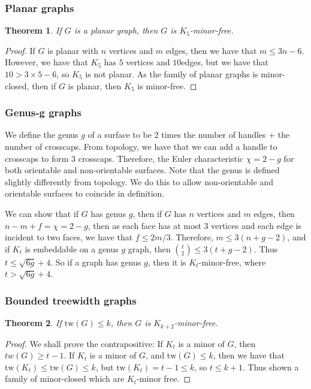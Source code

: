 \documentclass[]{article}
\newcommand{\tw}{\text{tw}}
\newtheorem{theorem}{Theorem}
\theoremstyle{definition}
\numberwithin{theorem}{section}
\numberwithin{equation}{section}
\begin{document}
\subsubsection{Planar graphs}
\begin{theorem}
	If $G$ is a planar graph, then $G$ is $K_5$-minor-free.
\end{theorem}
\begin{proof}
	If $G$ is planar with $n$ vertices and $m$ edges, then we have that $m \leq 3n -6$. However, we have that $K_5$ has $5$ vertices and $10$edges, but we have that $ 10 > 3 \times 5 - 6$, so $K_5$ is not planar. As the family of planar graphs is minor-closed, then if $G$ is planar, then $K_5$ is minor-free.
\end{proof}

\subsubsection{Genus-g graphs}
We define the genus $g$ of a surface to be 2 times the number of handles + the number of crosscaps. From topology, we have that we can add a handle to crosscaps to form 3 crosscaps. Therefore, the Euler characteristic $\chi = 2 - g$ for both orientable and non-orientable surfaces. Note that the genus is defined slightly differently from topology. We do this to allow non-orientable and orientable surfaces to coincide in definition.

We can show that if $G$ has genus $g$, then if $G$ has $n$ vertices and $m$ edges, then $n - m + f = \chi = 2-g$, then as each face has at most 3 vertices and each edge is incident to two faces, we have that $f \leq 2m/3$. Therefore, $m \leq 3(n + g - 2)$, and if $K_t$ is embeddable on a genus $g$ graph, then $\binom{t}{2} \leq 3 (t + g - 2)$. Thus $t \leq \sqrt{6g} + 4$. So if a graph has genus $g$, then it is $K_t$-minor-free, where $t > \sqrt{6g} + 4$. 

\subsubsection{Bounded treewidth graphs}
\begin{theorem}
	If $\tw(G) \leq k$, then $G$ is $K_{k+2}$-minor-free. 
\end{theorem}
\begin{proof}
	We shall prove the contrapositive: If $K_t$ is a minor of $G$, then $tw(G) \geq t-1$.
	If $K_t$ is a minor of $G$, and $\tw(G) \leq k$, then we have that $\tw(K_t) \leq \tw(G) \leq k$, but $\tw(K_t) = t-1 \leq k$, so $t \leq k + 1$. Thus shown a family of minor-closed which are $K_t$-minor free. 
\end{proof}
\end{document}
